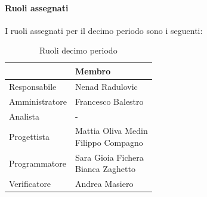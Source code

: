 \documentclass[a4paper,12pt]{article}
\begin{document}
            \paragraph{Ruoli assegnati}
            I ruoli assegnati per il decimo periodo sono i seguenti:
                \begin{table}[H]
                \centering
                \caption{Ruoli decimo periodo}
                \begin{tabular}{|l|l|}
                \hline
                    \rowcolor{lightgray}{\textbf{Ruolo}} & {\textbf{Membro}} \\
                \hline
                    Responsabile & Nenad Radulovic  \\
                \hline
                    Amministratore & Francesco Balestro  \\
                \hline
                    Analista & - \\
                \hline
                    Progettista & \makecell[l]{ Mattia Oliva Medin \\ Filippo Compagno }  \\
                \hline
                    Programmatore & \makecell[l]{ Sara Gioia Fichera\\ Bianca Zaghetto } \\
                \hline
                    Verificatore & Andrea Masiero \\
                \hline
                \end{tabular}
                \end{table}
                
\end{document}
